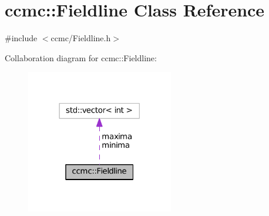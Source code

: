 \hypertarget{classccmc_1_1_fieldline}{\section{ccmc\-:\-:Fieldline Class Reference}
\label{classccmc_1_1_fieldline}
}


{\ttfamily \#include $<$ccmc/\-Fieldline.\-h$>$}



Collaboration diagram for ccmc\-:\-:Fieldline\-:\nopagebreak
\begin{figure}[H]
\begin{center}
\leavevmode
\includegraphics[width=182pt]{classccmc_1_1_fieldline__coll__graph}
\end{center}
\end{figure}
